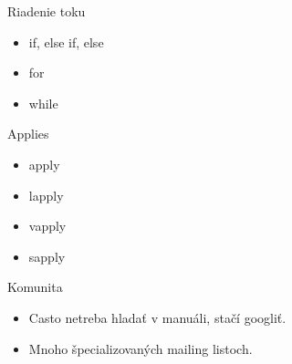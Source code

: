 \documentclass[14pt]{beamer}
\begin{document}
\begin{frame}{Riadenie toku}
	\begin{itemize}
		\item 	if, else if, else
		\item	for
		\item	while
	\end{itemize}
\end{frame}

\begin{frame}{Applies}
	\begin{itemize}
		\item 	apply
		\item	lapply
		\item	vapply
		\item	sapply
	\end{itemize}
\end{frame}


\begin{frame}{Komunita}
	\begin{itemize}
		\item Casto netreba hlada\v{t} v manu\'ali, sta\v{c}\'i googli\v{t}.
		\item Mnoho \v{s}pecializovan\'ych mailing listoch.
	\end{itemize}
\end{frame}
\end{document}
